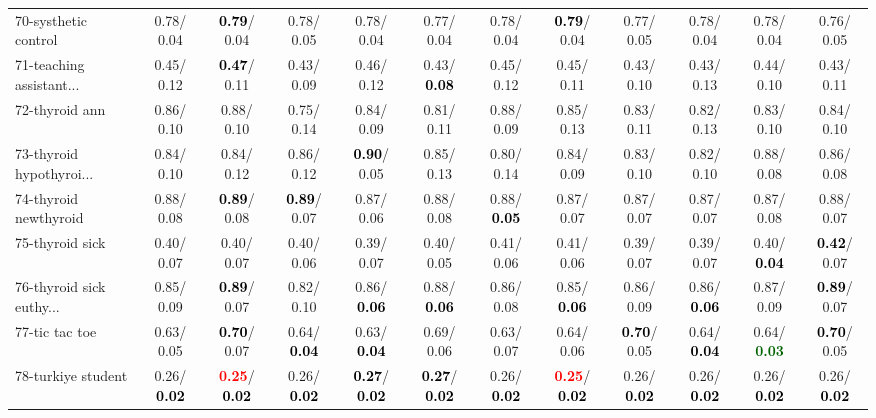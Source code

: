 \begin{table}[h]
\begin{center}
{\begin{tabular}{lc|c|c|c|c|c|c|c|c|c|c}
70-systhetic control &   0.78/  0.04 & \textcolor{black}{\textbf{  0.79}}/  0.04 &   0.78/  0.05 &   0.78/  0.04 &   0.77/  0.04 &   0.78/  0.04 & \textcolor{black}{\textbf{  0.79}}/  0.04 &   0.77/  0.05 &   0.78/  0.04 &   0.78/  0.04 &   0.76/  0.05 \\
71-teaching assistant... &   0.45/  0.12 & \textcolor{black}{\textbf{  0.47}}/  0.11 &   0.43/  0.09 &   0.46/  0.12 &   0.43/\textcolor{black}{\textbf{  0.08}} &   0.45/  0.12 &   0.45/  0.11 &   0.43/  0.10 &   0.43/  0.13 &   0.44/  0.10 &   0.43/  0.11 \\ \hline
72-thyroid ann &   0.86/  0.10 &   0.88/  0.10 &   0.75/  0.14 &   0.84/  0.09 &   0.81/  0.11 &   0.88/  0.09 &   0.85/  0.13 &   0.83/  0.11 &   0.82/  0.13 &   0.83/  0.10 &   0.84/  0.10 \\
73-thyroid hypothyroi... &   0.84/  0.10 &   0.84/  0.12 &   0.86/  0.12 & \textcolor{black}{\textbf{  0.90}}/  0.05 &   0.85/  0.13 &   0.80/  0.14 &   0.84/  0.09 &   0.83/  0.10 &   0.82/  0.10 &   0.88/  0.08 &   0.86/  0.08 \\
74-thyroid newthyroid &   0.88/  0.08 & \textcolor{black}{\textbf{  0.89}}/  0.08 & \textcolor{black}{\textbf{  0.89}}/  0.07 &   0.87/  0.06 &   0.88/  0.08 &   0.88/\textcolor{black}{\textbf{  0.05}} &   0.87/  0.07 &   0.87/  0.07 &   0.87/  0.07 &   0.87/  0.08 &   0.88/  0.07 \\
75-thyroid sick &   0.40/  0.07 &   0.40/  0.07 &   0.40/  0.06 &   0.39/  0.07 &   0.40/  0.05 &   0.41/  0.06 &   0.41/  0.06 &   0.39/  0.07 &   0.39/  0.07 &   0.40/\textcolor{black}{\textbf{  0.04}} & \textcolor{black}{\textbf{  0.42}}/  0.07 \\
76-thyroid sick euthy... &   0.85/  0.09 & \textcolor{black}{\textbf{  0.89}}/  0.07 &   0.82/  0.10 &   0.86/\textcolor{black}{\textbf{  0.06}} &   0.88/\textcolor{black}{\textbf{  0.06}} &   0.86/  0.08 &   0.85/\textcolor{black}{\textbf{  0.06}} &   0.86/  0.09 &   0.86/\textcolor{black}{\textbf{  0.06}} &   0.87/  0.09 & \textcolor{black}{\textbf{  0.89}}/  0.07 \\
77-tic tac toe &   0.63/  0.05 & \textcolor{black}{\textbf{  0.70}}/  0.07 &   0.64/\textcolor{black}{\textbf{  0.04}} &   0.63/\textcolor{black}{\textbf{  0.04}} &   0.69/  0.06 &   0.63/  0.07 &   0.64/  0.06 & \textcolor{black}{\textbf{  0.70}}/  0.05 &   0.64/\textcolor{black}{\textbf{  0.04}} &   0.64/\textcolor{darkgreen}{\textbf{  0.03}} & \textcolor{black}{\textbf{  0.70}}/  0.05 \\
78-turkiye student &   0.26/\textcolor{black}{\textbf{  0.02}} & \textcolor{red}{\textbf{  0.25}}/\textcolor{black}{\textbf{  0.02}} &   0.26/\textcolor{black}{\textbf{  0.02}} & \textcolor{black}{\textbf{  0.27}}/\textcolor{black}{\textbf{  0.02}} & \textcolor{black}{\textbf{  0.27}}/\textcolor{black}{\textbf{  0.02}} &   0.26/\textcolor{black}{\textbf{  0.02}} & \textcolor{red}{\textbf{  0.25}}/\textcolor{black}{\textbf{  0.02}} &   0.26/\textcolor{black}{\textbf{  0.02}} &   0.26/\textcolor{black}{\textbf{  0.02}} &   0.26/\textcolor{black}{\textbf{  0.02}} &   0.26/\textcolor{black}{\textbf{  0.02}} \\ \hline

\end{tabular}}
\end{center}
\end{table}
